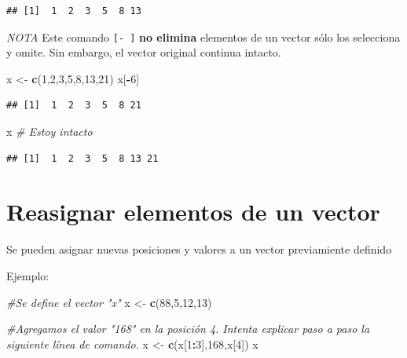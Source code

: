\documentclass[
]{book}
\newenvironment{Shaded}{\begin{snugshade}}{\end{snugshade}}
\newcommand{\CommentTok}[1]{\textcolor[rgb]{0.56,0.35,0.01}{\textit{#1}}}
\newcommand{\DecValTok}[1]{\textcolor[rgb]{0.00,0.00,0.81}{#1}}
\newcommand{\FunctionTok}[1]{\textcolor[rgb]{0.13,0.29,0.53}{\textbf{#1}}}
\newcommand{\NormalTok}[1]{#1}
\newcommand{\OtherTok}[1]{\textcolor[rgb]{0.56,0.35,0.01}{#1}}
\newcommand{\SpecialCharTok}[1]{\textcolor[rgb]{0.81,0.36,0.00}{\textbf{#1}}}
\begin{document}
\begin{verbatim}
## [1]  1  2  3  5  8 13
\end{verbatim}

\emph{NOTA} Este comando \texttt{{[}-\ {]}} \textbf{no elimina} elementos de un vector sólo los selecciona y omite. Sin embargo, el vector original continua intacto.

\begin{Shaded}
\begin{Highlighting}[]
\NormalTok{x }\OtherTok{\textless{}{-}} \FunctionTok{c}\NormalTok{(}\DecValTok{1}\NormalTok{,}\DecValTok{2}\NormalTok{,}\DecValTok{3}\NormalTok{,}\DecValTok{5}\NormalTok{,}\DecValTok{8}\NormalTok{,}\DecValTok{13}\NormalTok{,}\DecValTok{21}\NormalTok{)}
\NormalTok{x[}\SpecialCharTok{{-}}\DecValTok{6}\NormalTok{] }
\end{Highlighting}
\end{Shaded}

\begin{verbatim}
## [1]  1  2  3  5  8 21
\end{verbatim}

\begin{Shaded}
\begin{Highlighting}[]
\NormalTok{x     }\CommentTok{\# Estoy intacto}
\end{Highlighting}
\end{Shaded}

\begin{verbatim}
## [1]  1  2  3  5  8 13 21
\end{verbatim}

\section{Reasignar elementos de un vector}\label{reasignar-elementos-de-un-vector}

Se pueden asignar nuevas posiciones y valores a un vector previamiente definido

Ejemplo:

\begin{Shaded}
\begin{Highlighting}[]
\CommentTok{\#Se define el vector "x"}
\NormalTok{x }\OtherTok{\textless{}{-}} \FunctionTok{c}\NormalTok{(}\DecValTok{88}\NormalTok{,}\DecValTok{5}\NormalTok{,}\DecValTok{12}\NormalTok{,}\DecValTok{13}\NormalTok{)}

\CommentTok{\#Agregamos el valor "168" en la posición 4. Intenta explicar paso a paso la siguiente línea de comando. }
\NormalTok{x }\OtherTok{\textless{}{-}} \FunctionTok{c}\NormalTok{(x[}\DecValTok{1}\SpecialCharTok{:}\DecValTok{3}\NormalTok{],}\DecValTok{168}\NormalTok{,x[}\DecValTok{4}\NormalTok{]) }
\NormalTok{x}
\end{Highlighting}
\end{Shaded}
\end{document}
